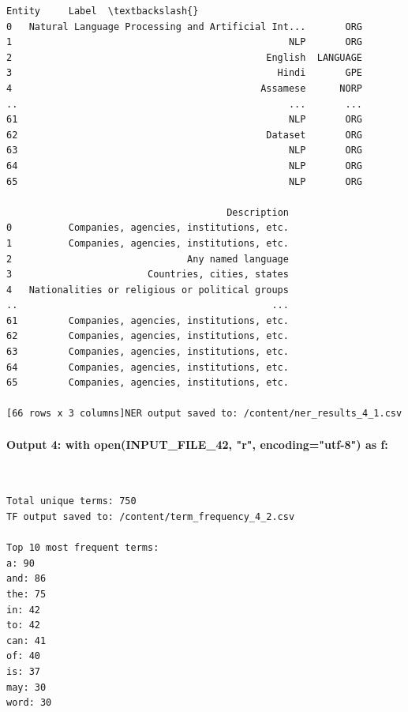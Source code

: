 \documentclass[12pt,a4paper,oneside]{report}
\begin{document}
\begin{Verbatim}[commandchars=\\\{\},breaklines=true,breakanywhere=true,fontsize=\scriptsize,frame=leftline,framesep=2mm,rulecolor=\color{gray}]
                                               Entity     Label  \textbackslash{}
0   Natural Language Processing and Artificial Int...       ORG
1                                                 NLP       ORG
2                                             English  LANGUAGE
3                                               Hindi       GPE
4                                            Assamese      NORP
..                                                ...       ...
61                                                NLP       ORG
62                                            Dataset       ORG
63                                                NLP       ORG
64                                                NLP       ORG
65                                                NLP       ORG

                                       Description
0          Companies, agencies, institutions, etc.
1          Companies, agencies, institutions, etc.
2                               Any named language
3                        Countries, cities, states
4   Nationalities or religious or political groups
..                                             ...
61         Companies, agencies, institutions, etc.
62         Companies, agencies, institutions, etc.
63         Companies, agencies, institutions, etc.
64         Companies, agencies, institutions, etc.
65         Companies, agencies, institutions, etc.

[66 rows x 3 columns]NER output saved to: /content/ner_results_4_1.csv
\end{Verbatim}
\paragraph{Output 4: with open(INPUT\_FILE\_42, "r", encoding="utf-8") as f:}\mbox{}\\[-1ex]
\begin{Verbatim}[commandchars=\\\{\},breaklines=true,breakanywhere=true,fontsize=\scriptsize,frame=leftline,framesep=2mm,rulecolor=\color{gray}]
Total unique terms: 750
TF output saved to: /content/term_frequency_4_2.csv

Top 10 most frequent terms:
a: 90
and: 86
the: 75
in: 42
to: 42
can: 41
of: 40
is: 37
may: 30
word: 30
\end{Verbatim}
\end{document}
